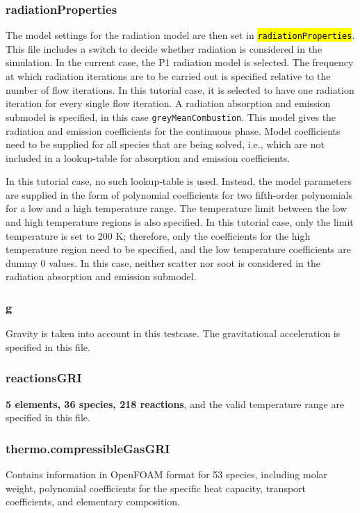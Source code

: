 \subsubsection*{radiationProperties}
The model settings for the radiation model are then set in \hl{\texttt{radiationProperties}}.
This file includes a switch to decide whether radiation is considered in the simulation. In the current case, the P1 radiation model is selected. The frequency at which radiation iterations are to be carried out is specified relative to the number of flow iterations. In this tutorial case, it is selected to have one radiation iteration for every single flow iteration. A radiation absorption and emission submodel is specified, in this case \texttt{greyMeanCombustion}. This model gives the radiation and emission coefficients for the continuous phase. Model coefficients need to be supplied for all species that are being solved, i.e., which are not included in a lookup-table for absorption and emission coefficients. 

In this tutorial case, no such lookup-table is used. Instead, the model parameters are supplied in the form of polynomial coefficients for two fifth-order polynomials for a low and a high temperature range. The temperature limit between the low and high temperature regions is also specified. In this tutorial case, only the limit temperature is set to 200 K; therefore, only the coefficients for the high temperature region need to be specified, and the low temperature coefficients are dummy 0 values. In this case, neither scatter nor soot is considered in the radiation absorption and emission submodel.

\subsubsection*{g}
Gravity is taken into account in this testcase. The gravitational acceleration is specified in this file.

\subsubsection*{reactionsGRI}
\textbf{5 elements, 36 species, 218 reactions}, and the valid temperature range are specified in this file.

\subsubsection*{thermo.compressibleGasGRI}
Contains information in OpenFOAM format for 53 species, including molar weight, polynomial coefficients for the specific heat capacity, transport coefficients, and elementary composition.

